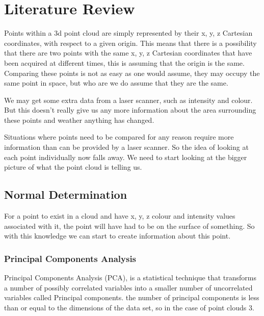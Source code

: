 
\section{Literature Review}
	
	
	
	
	Points within a 3d point cloud are simply represented by their x, y, z Cartesian coordinates, with respect to a given origin. This means that there is a possibility that there are two points with the same x, y, z Cartesian coordinates that have been acquired at different times, this is assuming that the origin is the same. Comparing these points is not as easy as one would assume, they may occupy the same point in space, but who are we do assume that they are the same.
	
	We may get some extra data from a laser scanner, such as intensity and colour. But this doesn't really give us any more information about the area surrounding these points and weather anything has changed.
	
	Situations where points need to be compared for any reason require more information than can be provided by a laser scanner. So the idea of looking at each point individually now falls away. We need to start looking at the bigger picture of what the point cloud is telling us.
	
	\subsection{Normal Determination}
	For a point to exist in a cloud and have x, y, z colour and intensity values associated with it, the point will have had to be on the surface of something. So with this knowledge we can start to create information about this point.
			
		\subsubsection{Principal Components Analysis}
		Principal Components Analysis (PCA), is a statistical technique that transforms a number of possibly correlated variables into a smaller number of uncorrelated variables called Principal components. the number of principal components is less than or equal to the dimensions of the data set, so in the case of point clouds 3.
		
